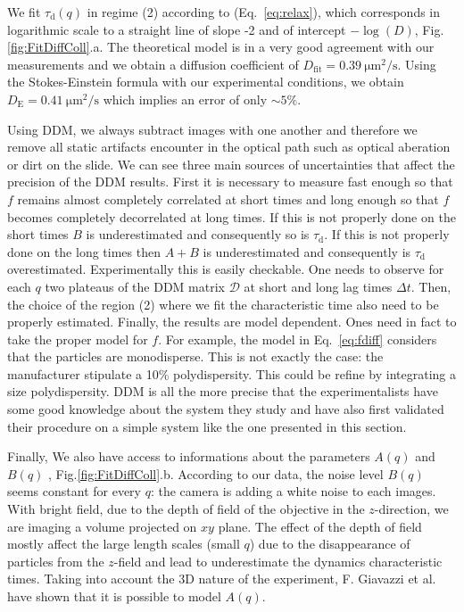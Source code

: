 \documentclass[prb,reprint,amsmath,amssymb]{revtex4-1}
\newcommand{\tg}[1]{{\color{magenta}#1}} %
\begin{document}
We fit $\tau_\text{d}(q)$ in regime (2) according to (Eq.~\ref{eq:relax}), which corresponds in logarithmic scale to a straight line of slope -2 and of intercept $-\log(D)$, Fig.\ref{fig:FitDiffColl}.a. The theoretical model is in a very good agreement with our measurements and we obtain a diffusion coefficient of $D_\text{fit} = \SI{0.39}{\micro\meter\squared\per\second}$. Using the Stokes-Einstein formula with our experimental conditions, we obtain $D_\text{E} = \SI{0.41}{\micro\meter\squared\per\second}$ which implies an error of only $\sim 5 \%$. 

\tg{Using DDM, we always subtract images with one another and therefore we remove all static artifacts encounter in the optical path such as optical aberation or dirt on the slide. We can see three main sources of uncertainties that affect the precision of the DDM results. First it is necessary to measure fast enough so that $f$ remains almost completely correlated at short times and long enough so that $f$ becomes completely decorrelated at long times. If this is not properly done on the short times $B$ is underestimated and consequently so is $\tau_\text{d}$. If this is not properly done on the long times then  $A+B$ is underestimated and consequently is $\tau_\text{d}$ overestimated. Experimentally this is easily checkable. One needs to observe for each $q$ two plateaus of the DDM matrix $\mathcal{D}$ at short and long lag times $\Delta t$. Then, the choice of the region (2) where we fit the characteristic time also need to be properly estimated. Finally, the results are model dependent. Ones need in fact to take the proper model for $f$. For example, the model in Eq.~\eqref{eq:fdiff}  considers that the particles are monodisperse. This is not exactly the case: the manufacturer stipulate a 10\% polydispersity. This could be refine by integrating a size polydispersity. DDM is all the more precise that the experimentalists have some good knowledge about the system they study and have also first validated their procedure on a simple system like the one presented in this section}.

Finally, We also have access to informations about the parameters $A(q)$ and $B(q)$ , Fig.\ref{fig:FitDiffColl}.b. According to our data, the noise level $B(q)$ seems constant for every $q$: the camera is adding a white noise to each images. With bright field, due to the depth of field of the objective in the $z$-direction, we are imaging a volume projected on $xy$ plane. The effect of the depth of field mostly affect the large length scales (small $q$) due to the disappearance of particles from the $z$-field and lead to underestimate the dynamics characteristic times\cite {4_Martinez20121637}. Taking into account the 3D nature of the experiment,  F. Giavazzi et al.\citep{3_DDM3D} have shown that it is possible to model $A(q)$.
\end{document}
